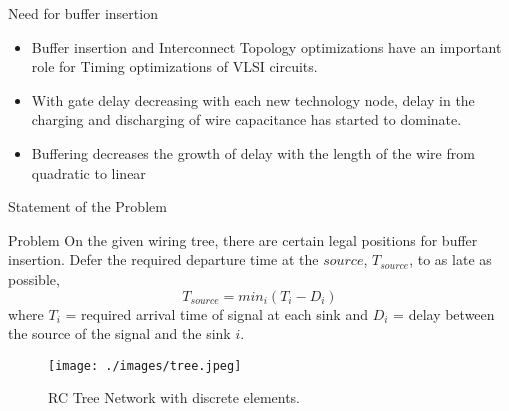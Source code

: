 \documentclass[10pt,sans,serif,trans]{beamer}
\begin{document}
\begin{frame}{Need for buffer insertion}
 \begin{itemize}
 \item Buffer insertion and Interconnect Topology optimizations have an important role for Timing
optimizations of VLSI circuits.
    \item With gate delay decreasing with each new technology node, delay in the charging and
discharging of wire capacitance has started to dominate.
\item Buffering decreases the growth of delay with the length of the wire from quadratic to linear
 \end{itemize}
\end{frame}
\begin{frame}{Statement of the Problem}
\begin{block}{Problem}
      On the given wiring tree, there are certain legal positions for buffer insertion. Defer the
required departure time at the $source$, $T_{source}$, to as late as possible, \\
\begin{equation}
T_{source} = min_i(T_i-D_i)    
\end{equation}
	where $T_i$ = required arrival time of signal at each sink and $D_i$ = delay between the source
of the signal and the sink $i$.
\end{block}
\begin{figure}[h]
\centering
\texttt{[image: ./images/tree.jpeg]} 
\caption{RC Tree Network with discrete elements.}
\end{figure}
\end{frame}
\end{document}
